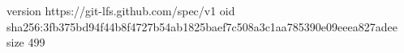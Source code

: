 version https://git-lfs.github.com/spec/v1
oid sha256:3fb375bd94f44b8f4727b54ab1825baef7c508a3c1aa785390e09eeea827adee
size 499
